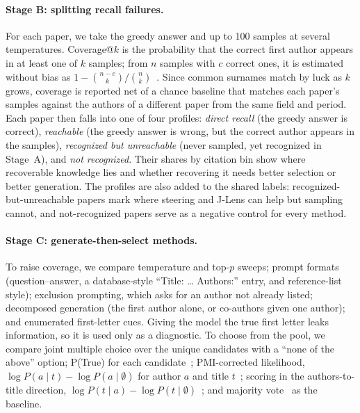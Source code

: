 \paragraph{Stage B: splitting recall failures.}
For each paper, we take the greedy answer and up to 100 samples at several temperatures. Coverage@$k$ is the probability that the correct first author appears in at least one of $k$ samples; from $n$ samples with $c$ correct ones, it is estimated without bias as $1-\binom{n-c}{k}/\binom{n}{k}$~\cite{chen2021codex}. Since common surnames match by luck as $k$ grows, coverage is reported net of a chance baseline that matches each paper's samples against the authors of a different paper from the same field and period. Each paper then falls into one of four profiles: \emph{direct recall} (the greedy answer is correct), \emph{reachable} (the greedy answer is wrong, but the correct author appears in the samples), \emph{recognized but unreachable} (never sampled, yet recognized in Stage~A), and \emph{not recognized}. Their shares by citation bin show where recoverable knowledge lies and whether recovering it needs better selection or better generation. The profiles are also added to the shared labels: recognized-but-unreachable papers mark where steering and J-Lens can help but sampling cannot, and not-recognized papers serve as a negative control for every method.

\paragraph{Stage C: generate-then-select methods.}
To raise coverage, we compare temperature and top-$p$ sweeps; prompt formats (question--answer, a database-style ``Title: \ldots{} Authors:'' entry, and reference-list style); exclusion prompting, which asks for an author not already listed; decomposed generation (the first author alone, or co-authors given one author); and enumerated first-letter cues. Giving the model the true first letter leaks information, so it is used only as a diagnostic. To choose from the pool, we compare joint multiple choice over the unique candidates with a ``none of the above'' option; P(True) for each candidate~\cite{kadavath2022language}; PMI-corrected likelihood, $\log P(a\mid t)-\log P(a\mid\emptyset)$ for author $a$ and title $t$~\cite{holtzman2021surface}; scoring in the authors-to-title direction, $\log P(t\mid a)-\log P(t\mid\emptyset)$~\cite{berglund2024reversal}; and majority vote~\cite{wang2023selfconsistency} as the baseline.

